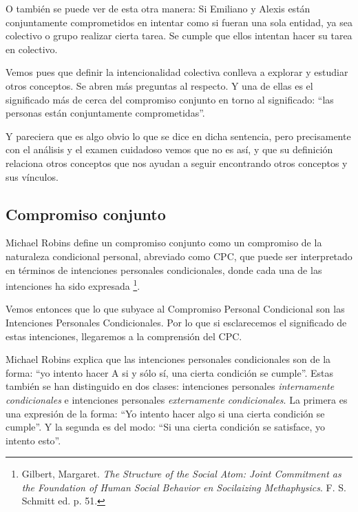\documentclass[oneside]{book}
\begin{document}
O también se puede ver de esta otra manera: Si Emiliano y Alexis están conjuntamente comprometidos en intentar como si fueran una sola entidad, ya sea colectivo o grupo realizar cierta tarea. Se cumple que ellos intentan hacer su tarea en colectivo.

Vemos pues que definir la intencionalidad colectiva conlleva a explorar y estudiar otros conceptos. Se abren más preguntas al respecto. Y una de ellas es el significado más de cerca del compromiso conjunto en torno al significado: “las personas están conjuntamente comprometidas”.

Y pareciera que es algo obvio lo que se dice en dicha sentencia, pero precisamente con el análisis y el examen cuidadoso vemos que no es así, y que su definición relaciona otros conceptos que nos ayudan a seguir encontrando otros conceptos y sus vínculos.
	
\subsection{Compromiso conjunto}

Michael Robins define un compromiso conjunto como un compromiso de la naturaleza condicional personal, abreviado como CPC, que puede ser interpretado en términos de intenciones personales condicionales, donde cada una de las intenciones ha sido expresada \footnote{Gilbert, Margaret. \textit{The Structure of the Social Atom: Joint Commitment as the Foundation of Human Social Behavior en Socilaizing Methaphysics}. F. S. Schmitt ed. p. 51.}.

Vemos entonces que lo que subyace al Compromiso Personal Condicional son las Intenciones Personales Condicionales. Por lo que si esclarecemos el significado de estas intenciones, llegaremos a la comprensión  del CPC.

Michael Robins explica que las intenciones personales condicionales son de la forma: “yo intento hacer A si y sólo sí, una cierta condición se cumple”. Estas también se han distinguido en dos clases: intenciones personales \textit{internamente condicionales} e intenciones personales \textit{externamente condicionales}. La primera es una expresión de la forma: “Yo intento hacer algo si una cierta condición se cumple”. Y la segunda es del modo: “Si una cierta condición se satisface, yo intento esto”.
\end{document}
